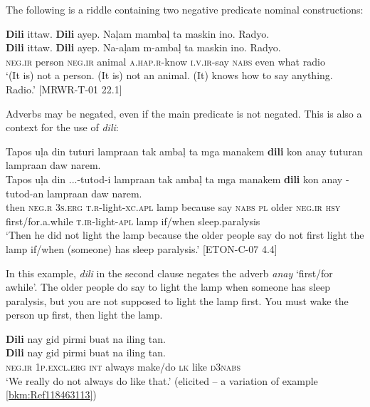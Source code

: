 The following is a riddle containing two negative predicate nominal constructions:

\ea
\textbf{Dili}  ittaw.  \textbf{Dili}  ayep.  Naļam  mambaļ  ta  maskin  ino. Radyo. \\\smallskip
\gll \textbf{Dili}  ittaw.  \textbf{Dili}  ayep.  Na-aļam  m-ambaļ  ta  maskin  ino. Radyo. \\
\textsc{neg.ir}  person  \textsc{neg.ir}  animal  \textsc{a.hap.r}-know  \textsc{i.v.ir}-say  \textsc{nabs}  even  what radio \\
\glt ‘(It is) not a person. (It is) not an animal. (It) knows how to say anything. Radio.’ [MRWR-T-01 22.1]
\z

Adverbs may be negated, even if the main predicate is not negated. This is also a context for the use of \textit{dili}:

\ea
Tapos  uļa  din  tuturi  lampraan  tak  ambaļ  ta  mga manakem  \textbf{dili}  kon  anay  tuturan  lampraan  daw    narem. \\\smallskip
\gll Tapos  uļa  din  ...-tutod-i  lampraan  tak  ambaļ  ta  mga manakem  \textbf{dili}  kon  anay  \emptyset{}-tutod-an  lampraan  daw narem. \\
then  \textsc{neg.r}  3\textsc{s.erg}  \textsc{t.r}-light-\textsc{xc.apl}  lamp  because  say  \textsc{nabs}  \textsc{pl}
older  \textsc{neg.ir}  \textsc{hsy}  first/for.a.while  \textsc{t.ir}-light-\textsc{apl}  lamp  if/when sleep.paralysis \\
\glt ‘Then he did not light the lamp because the older people say do not first light the lamp if/when (someone) has sleep paralysis.' [ETON-C-07 4.4]
\z

In this example, \textit{dili} in the second clause negates the adverb \textit{anay} ‘first/for awhile’. The older people do say to light the lamp when someone has sleep paralysis, but you are not supposed to light the lamp first. You must wake the person up first, then light the lamp.

\ea
\textbf{Dili}  nay  gid  pirmi  buat  na  iling  tan. \\\smallskip
\gll \textbf{Dili}  nay  gid  pirmi  buat  na  iling  tan. \\
\textsc{neg.ir}  1\textsc{p.excl.erg}  \textsc{int}  always  make/do  \textsc{lk}  like  \textsc{d3nabs} \\
\glt ‘We really do not always do like that.’ (elicited – a variation of example \ref{bkm:Ref118463113})
\z

